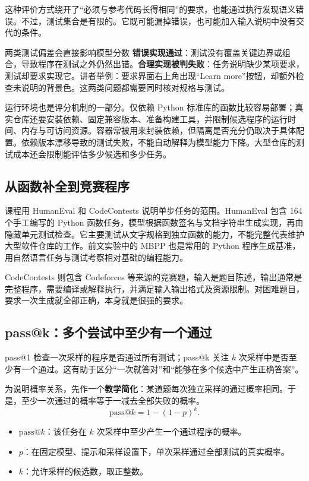 \documentclass[11pt,a4paper]{article}
\begin{document}
这种评价方式绕开了“必须与参考代码长得相同”的要求，也能通过执行发现语义错误。不过，测试集合是有限的。它既可能漏掉错误，也可能加入输入说明中没有交代的条件。

\begin{warningbox}{两类测试偏差会直接影响模型分数}
\textbf{错误实现通过}：测试没有覆盖关键边界或组合，导致程序在测试之外仍然出错。\textbf{合理实现被判失败}：任务说明缺少某项要求，测试却要求实现它。讲者举例：要求界面右上角出现“Learn more”按钮，却额外检查未说明的背景色。这两类问题都需要同时核对规格与测试。
\end{warningbox}

运行环境也是评分机制的一部分。仅依赖 Python 标准库的函数比较容易部署；真实仓库还要安装依赖、固定兼容版本、准备构建工具，并限制候选程序的运行时间、内存与可访问资源。容器常被用来封装依赖，但隔离是否充分仍取决于具体配置。依赖版本漂移导致的测试失败，不能自动解释为模型能力下降。大型仓库的测试成本还会限制能评估多少候选和多少任务。

\subsection{从函数补全到竞赛程序}

课程用 HumanEval 和 CodeContests 说明单步任务的范围。HumanEval 包含 164 个手工编写的 Python 函数任务，模型根据函数签名与文档字符串生成实现，再由隐藏单元测试检查。它主要测试从文字规格到独立函数的能力，不能完整代表维护大型软件仓库的工作。前文实验中的 MBPP 也是常用的 Python 程序生成基准，用自然语言任务与测试考察相对基础的编程能力。

CodeContests 则包含 Codeforces 等来源的竞赛题，输入是题目陈述，输出通常是完整程序，需要编译或解释执行，并满足输入输出格式及资源限制。对困难题目，要求一次生成就全部正确，本身就是很强的要求。

\subsection{pass@k：多个尝试中至少有一个通过}

pass@1 检查一次采样的程序是否通过所有测试；pass@k 关注 $k$ 次采样中是否至少有一个通过。这有助于区分“一次就答对”和“能够在多个候选中产生正确答案”。

为说明概率关系，先作一个\textbf{教学简化}：某道题每次独立采样的通过概率相同。于是，至少一次通过的概率等于一减去全部失败的概率。
$$
\mathrm{pass@}k=1-(1-p)^k.
$$
\begin{itemize}\setlength{\itemsep}{2pt}\setlength{\parsep}{0pt}\setlength{\topsep}{4pt}
\item $\mathrm{pass@}k$：该任务在 $k$ 次采样中至少产生一个通过程序的概率。
\item $p$：在固定模型、提示和采样设置下，单次采样通过全部测试的真实概率。
\item $k$：允许采样的候选数，取正整数。
\end{itemize}
\end{document}
